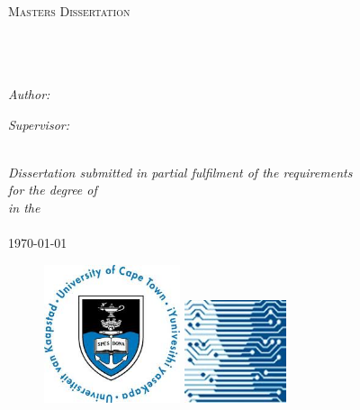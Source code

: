 \documentclass[11pt, a4paper, oneside]{Thesis} %
\begin{document}
\begin{titlepage}

\begin{center}

\textsc{\LARGE \univname}\\[1.5cm] %
\textsc{\Large Masters Dissertation}\\[0.5cm] %

\HRule \\[0.4cm] %
{\huge \bfseries \ttitle}\\[0.4cm] %
\HRule \\[1.5cm] %
 
\begin{minipage}{0.4\textwidth}
\begin{flushleft} \large
\emph{Author:}\\
\authornames %
\end{flushleft}
\end{minipage}
\begin{minipage}{0.4\textwidth}
\begin{flushright} \large
\emph{Supervisor:} \\
\supname %
\end{flushright}
\end{minipage}\\[2cm]

\large \textit{Dissertation submitted in partial fulfilment of the requirements\\ for the degree of \degreename}\\[0.3cm] %
\textit{in the}\\[0.4cm]
\deptname\\[2cm] %
{\large \today}\\[2cm] %
 \begin{figure}[h!]
 \centering
 \includegraphics[width=4cm]{Figures/uctlogo.jpg} 
 \hspace{2cm} 
 \includegraphics[width=3cm]{Figures/compsci.jpg}  
 \end{figure} 

\end{center}

\end{titlepage}
\end{document}
